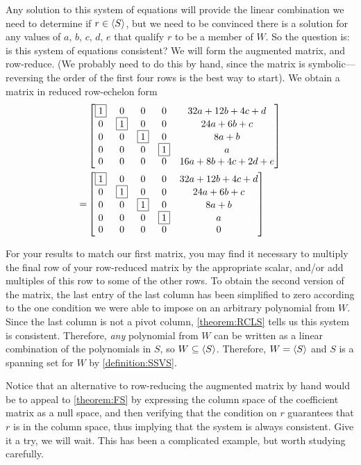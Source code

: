 \documentclass{ximera}
\begin{document}
\begin{example}
  Any solution to this system of equations will provide the linear
  combination we need to determine if $r\in\left\langle S\right\rangle$, but we need to be
  convinced there is a solution for any values of $a,\,b,\,c,\,d,\,e$
  that qualify $r$ to be a member of $W$.  So the question is: is this
  system of equations consistent?  We will form the augmented matrix,
  and row-reduce. (We probably need to do this by hand, since the
  matrix is symbolic---reversing the order of the first four rows is
  the best way to start).  We obtain a matrix in reduced row-echelon
  form
  \begin{align*}
    &\begin{bmatrix}
      \fbox{1}&0&0&0&32a+12b+4c+d\\
      0&\fbox{1}&0&0&24a+6b+c\\
      0&0&\fbox{1}&0&8a+b\\
      0&0&0&\fbox{1}&a\\
      0&0&0&0&16a+8b+4c+2d+e
    \end{bmatrix}\\
    =&
       \begin{bmatrix}
         \fbox{1}&0&0&0&32a+12b+4c+d\\
         0&\fbox{1}&0&0&24a+6b+c\\
         0&0&\fbox{1}&0&8a+b\\
         0&0&0&\fbox{1}&a\\
         0&0&0&0&0
       \end{bmatrix}
  \end{align*}

  For your results to match our first matrix, you may find it
  necessary to multiply the final row of your row-reduced matrix by
  the appropriate scalar, and/or add multiples of this row to some of
  the other rows.  To obtain the second version of the matrix, the
  last entry of the last column has been simplified to zero according
  to the one condition we were able to impose on an arbitrary
  polynomial from $W$.  Since the last column is not a pivot column,
  \ref{theorem:RCLS} tells us this system is consistent.  Therefore,
  \textit{any} polynomial from $W$ can be written as a linear
  combination of the polynomials in $S$, so
  $W\subseteq\left\langle S\right\rangle$. Therefore, $W=\left\langle S\right\rangle$ and $S$ is a spanning
  set for $W$ by \ref{definition:SSVS}.

  Notice that an alternative to row-reducing the augmented matrix by
  hand would be to appeal to \ref{theorem:FS} by expressing the column
  space of the coefficient matrix as a null space, and then verifying
  that the condition on $r$ guarantees that $r$ is in the column
  space, thus implying that the system is always consistent.  Give it
  a try, we will wait.  This has been a complicated example, but worth
  studying carefully.
\end{example}
\end{document}
